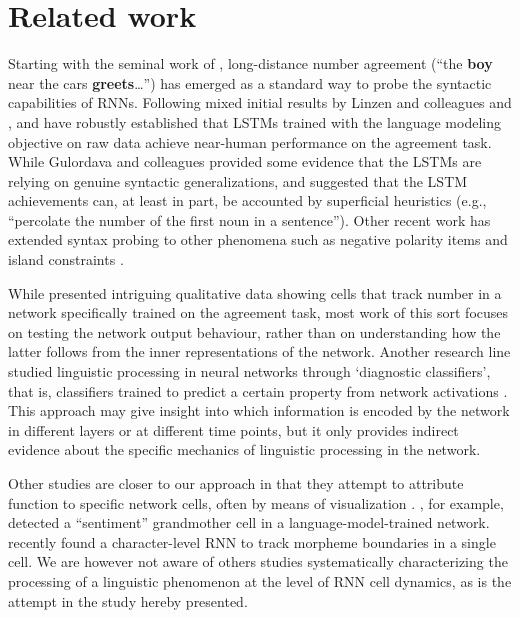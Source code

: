 
\section{Related work}

Starting with the seminal work of ,
long-distance number agreement (``the \textbf{boy} near the cars
\textbf{greets}\ldots'') has emerged as a standard way to probe the
syntactic capabilities of RNNs. Following
mixed initial results by Linzen and colleagues and
,  and
 have robustly established that LSTMs
trained with the language modeling objective on raw data achieve
near-human performance on the agreement task. While Gulordava and
colleagues provided some evidence that the LSTMs are relying on
genuine syntactic generalizations,  and
 suggested that the LSTM achievements
can, at least in part, be accounted by superficial heuristics (e.g., ``percolate the number of the first noun in a sentence''). Other
recent work has extended syntax probing to other phenomena such as
negative polarity items and island constraints
\cite{Chowdhury:Zamparelli:2018,jumelet2018language,marvin2018targeted,wilcox2018rnn}.

While  presented intriguing qualitative data
showing cells that track number in a network specifically trained on
the agreement task, most work of this sort focuses on testing the
network output behaviour, rather than on understanding how the latter
follows from the inner representations of the network. Another research line
studied linguistic processing in neural networks through `diagnostic classifiers', that is, classifiers trained to
predict a certain property from network activations
\cite[e.g.,][]{gelderloos2016phonemes,Adi:etal:2017,alain2017understanding,Hupkes:etal:2017}. This approach may give insight into which information is encoded by the
network in different layers or at different time points, but it only
provides indirect evidence about the specific mechanics of linguistic
processing in the network.

Other studies are closer to our approach in that they attempt to
attribute function to specific network cells, often by means of
visualization
\cite{Karpathy:etal:2016,li2016visualizing,tang2017memory}. ,
for example, detected a ``sentiment'' grandmother cell in a
language-model-trained network.  
recently found a character-level RNN to track morpheme boundaries in a
single cell. We are however not aware of others studies systematically
characterizing the processing of a linguistic phenomenon at the level of
RNN cell dynamics, as is the attempt in the study hereby presented.


